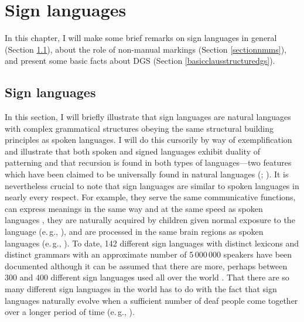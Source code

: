 \chapter{Sign languages}\label{chapterone}
In this chapter, I will make some brief remarks on sign languages in general (Section \ref{signlanguagesintro}), about the role of non-manual markings (Section \ref{sectionnmms}), and present some basic facts about DGS (Section \ref{basicclausstructuredgs}). 
%


\section{Sign languages}\label{signlanguagesintro}
In this section, I will briefly illustrate that sign languages are natural languages with complex grammatical structures obeying the same structural building principles as spoken languages. I will do this cursorily by way of exemplification and illustrate that both spoken and signed languages exhibit duality of patterning and that recursion is found in both types of languages---two features which have been  claimed to be universally found in natural languages (\citealt{martinet1949double}; \citealt{hockett1960origin}). It is nevertheless crucial to note that sign languages are similar to spoken languages in nearly every respect. For example, they serve the same communicative functions, can express meanings in the same way and at the same speed as spoken languages \citep{bellugi1972comparison}, they are naturally acquired by children given normal exposure to the language (e.\,g., \citealt{newport1985acquisition}), and are processed in the same brain regions as spoken languages (e.\,g., \citealt{emmorey2002language}). To date, 142 different sign languages with distinct lexicons and distinct grammars with an approximate number of 5\,000\,000 speakers have been documented \citep{simons2018ethnologue} although it can be assumed that there are more, perhaps between 300 and 400 different sign languages used all over the world \citep{zeshan2009sign}. That there are so many different sign languages in the world has to do with the fact that sign languages naturally evolve when a sufficient number of deaf people come together over a longer period of time (e.\,g., \citealt{kegletal1999creation}).

